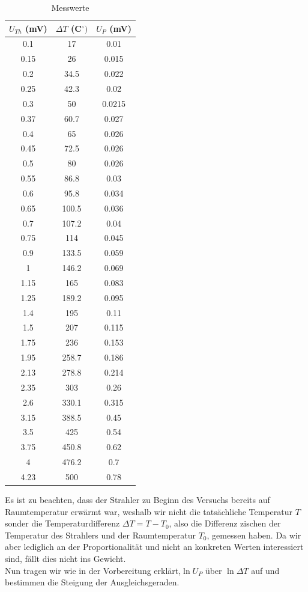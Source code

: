\documentclass[12pt,twoside,a4paper]{article}
\begin{document}
\begin{table}[H]
\centering
\caption{Messwerte}
	\begin{tabular}{c|c|c}
   $U_{Th}$ (mV) & $\Delta T $ (C$^\circ)$ & $U_P$ (mV)\\
		\hline
		 0.1 & 17 & 0.01\\
		 0.15 & 26 & 0.015\\
		 0.2 & 34.5 & 0.022\\
		 0.25 & 42.3 & 0.02\\					     
		 0.3 & 50 & 0.0215\\
		 0.37 & 60.7 & 0.027\\	
		 0.4 & 65 & 0.026\\
		 0.45 & 72.5 & 0.026\\	
		 0.5 & 80 & 0.026\\ 
		 0.55 & 86.8 & 0.03\\
		 0.6 & 95.8 & 0.034\\
		 0.65 & 100.5 & 0.036\\
		 0.7 & 107.2 & 0.04\\
		 0.75 & 114 & 0.045\\
		 0.9 & 133.5 & 0.059\\
		 1 & 146.2 & 0.069\\
		 1.15 & 165 & 0.083\\
		 1.25 & 189.2 & 0.095\\
		 1.4 & 195 & 0.11\\
		 1.5 & 207 & 0.115\\
		 1.75 & 236 & 0.153\\
		 1.95 & 258.7 & 0.186\\
		 2.13 & 278.8 & 0.214\\
		 2.35 & 303 & 0.26\\
		 2.6 & 330.1 & 0.315\\
		 3.15 & 388.5 & 0.45\\
		 3.5 & 425 & 0.54\\
		 3.75 & 450.8 & 0.62\\
		 4 & 476.2 & 0.7\\
		 4.23 & 500 & 0.78\\
	\end{tabular}
\end{table}

Es ist zu beachten, dass der Strahler zu Beginn des Versuchs bereits auf Raumtemperatur erwärmt war, weshalb wir nicht die tatsächliche Temperatur $T$ sonder die Temperaturdifferenz $\Delta T= T- T_0$, also die Differenz zischen der Temperatur des Strahlers und der Raumtemperatur $T_0$, gemessen haben. Da wir aber lediglich an der Proportionalität und nicht an konkreten Werten interessiert sind, fällt dies nicht ins Gewicht.\\
Nun tragen wir wie in der Vorbereitung erklärt,$\ln{U_P}$ über $\ln{\Delta T}$ auf und bestimmen die Steigung der Ausgleichsgeraden.
\end{document}
